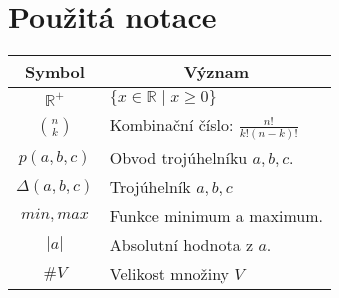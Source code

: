\chapter*{Použitá notace}
\label{sec:notace}
\noindent
\begin{table}[h]
    \centering
\begin{tabular}{c l}
    Symbol & \multicolumn{1}{c}{Význam} \\
    \toprule
    $\mathbb{R}^+$ & $\{ x \in \mathbb{R} \mid x \geq 0 \}$ \\
    $ \binom{n}{k}$ & Kombinační číslo: $\frac{n!}{k!(n-k)!}$ \\
    $ p(a, b, c)$ & Obvod trojúhelníku $a, b, c$. \\
    $\Delta(a,b,c)$ & Trojúhelník $a, b, c$\\
    $min, max$ & Funkce minimum a maximum. \\
    $ |a| $ & Absolutní hodnota z $a$. \\
    $ \#V $& Velikost množiny $V$ \\
\end{tabular}
\end{table}